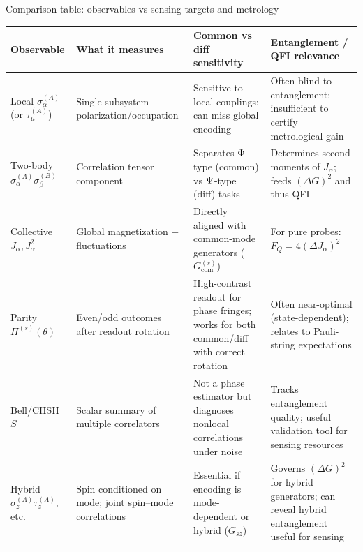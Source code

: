 \documentclass[aspectratio=169]{beamer}
\newcommand{\sA}[1]{\sigma_{#1}^{(A)}}
\newcommand{\sB}[1]{\sigma_{#1}^{(B)}}
\newcommand{\tA}[1]{\tau_{#1}^{(A)}}
\newcommand{\Jop}[1]{J_{#1}}
\newcommand{\GcomS}{G_{\mathrm{com}}^{(s)}}
\begin{document}
\begin{frame}{Comparison table: observables vs sensing targets and metrology}
\scriptsize
\renewcommand{\arraystretch}{1.2}
\begin{center}
\begin{tabular}{>{\raggedright\arraybackslash}p{2.85cm}
                >{\raggedright\arraybackslash}p{3.2cm}
                >{\raggedright\arraybackslash}p{3.3cm}
                >{\raggedright\arraybackslash}p{4.0cm}}
\toprule
\textbf{Observable} & \textbf{What it measures} &
\textbf{Common vs diff sensitivity} &
\textbf{Entanglement / QFI relevance} \\
\midrule
Local $\sA{\alpha}$ (or $\tA{\mu}$) & Single-subsystem polarization/occupation & Sensitive to local couplings; can miss global encoding & Often blind to entanglement; insufficient to certify metrological gain \\
Two-body $\sA{\alpha}\sB{\beta}$ & Correlation tensor component & Separates $\relax{\Phi}$-type (common) vs $\relax{\Psi}$-type (diff) tasks & Determines second moments of $\Jop{\alpha}$; feeds $(\Delta G)^2$ and thus QFI \\
Collective $\Jop{\alpha},\Jop{\alpha}^2$ & Global magnetization + fluctuations & Directly aligned with common-mode generators ($\GcomS$) & For pure probes: $F_Q=4(\Delta \Jop{\alpha})^2$ \\
Parity $\Pi^{(s)}(\theta)$ & Even/odd outcomes after readout rotation & High-contrast readout for phase fringes; works for both common/diff with correct rotation & Often near-optimal (state-dependent); relates to Pauli-string expectations \\
Bell/CHSH $S$ & Scalar summary of multiple correlators & Not a phase estimator but diagnoses nonlocal correlations under noise & Tracks entanglement quality; useful validation tool for sensing resources \\
Hybrid $\sA{z}\tA{z}$, etc. & Spin conditioned on mode; joint spin--mode correlations & Essential if encoding is mode-dependent or hybrid ($G_{sz}$) & Governs $(\Delta G)^2$ for hybrid generators; can reveal hybrid entanglement useful for sensing \\
\bottomrule
\end{tabular}
\end{center}
\end{frame}
\end{document}
